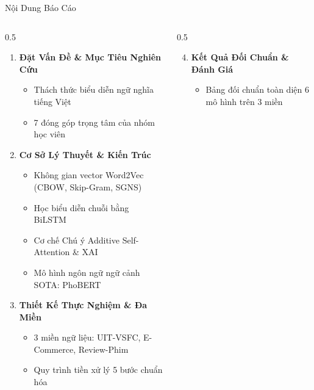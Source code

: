 \documentclass[aspectratio=169, 10pt]{beamer}
\begin{document}
\begin{frame}{Nội Dung Báo Cáo}
  \begin{columns}[c]
    \begin{column}{0.5\textwidth}
      \begin{enumerate}
        \setlength{\itemsep}{0.7em}
        \item \textbf{\color{HCMUEDarkBlue}Đặt Vấn Đề \& Mục Tiêu Nghiên Cứu}
        \begin{itemize}\fontsize{7.5}{9}\selectfont
          \item Thách thức biểu diễn ngữ nghĩa tiếng Việt
          \item 7 đóng góp trọng tâm của nhóm học viên
        \end{itemize}
        \item \textbf{\color{HCMUEDarkBlue}Cơ Sở Lý Thuyết \& Kiến Trúc}
        \begin{itemize}\fontsize{7.5}{9}\selectfont
          \item Không gian vector Word2Vec (CBOW, Skip-Gram, SGNS)
          \item Học biểu diễn chuỗi bằng BiLSTM
          \item Cơ chế Chú ý Additive Self-Attention \& XAI
          \item Mô hình ngôn ngữ ngữ cảnh SOTA: PhoBERT
        \end{itemize}
        \item \textbf{\color{HCMUEDarkBlue}Thiết Kế Thực Nghiệm \& Đa Miền}
        \begin{itemize}\fontsize{7.5}{9}\selectfont
          \item 3 miền ngữ liệu: UIT-VSFC, E-Commerce, Review-Phim
          \item Quy trình tiền xử lý 5 bước chuẩn hóa
        \end{itemize}
      \end{enumerate}
    \end{column}
    \begin{column}{0.5\textwidth}
      \begin{enumerate}
        \setcounter{enumi}{3}
        \setlength{\itemsep}{0.7em}
        \item \textbf{\color{HCMUEDarkBlue}Kết Quả Đối Chuẩn \& Đánh Giá}
        \begin{itemize}\fontsize{7.5}{9}\selectfont
          \item Bảng đối chuẩn toàn diện 6 mô hình trên 3 miền

\end{itemize}
\end{enumerate}
\end{column}
\end{columns}
\end{frame}
\end{document}
